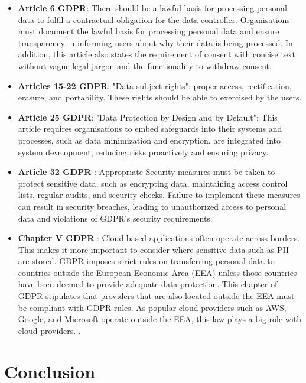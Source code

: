 \begin{itemize}
    \label{section:gdpr}
    \item \textbf{Article 6 GDPR}: There should be a lawful basis for processing personal data to fulfil a contractual obligation for the data controller. Organisations must document the lawful basis for processing personal data and ensure transparency in informing users about why their data is being processed. In addition, this article also states the requirement of consent with concise text without vague legal jargon and the functionality to withdraw consent.
    
    \item \textbf{Articles 15-22 GDPR}: "Data subject rights": proper access, rectification, erasure, and portability. These rights should be able to exercised by the users. 

    \item \textbf{Article 25 GDPR}: "Data Protection by Design and by Default": This article requires organisations to embed safeguards into their systems and processes, such as data minimization and encryption, are integrated into system development, reducing risks proactively and ensuring privacy. 

    \item \textbf{Article 32 GDPR }: Appropriate Security measures must be taken to protect sensitive data, such as encrypting data, maintaining access control lists, regular audits, and security checks. Failure to implement these measures can result in security breaches, leading to unauthorized access to personal data and violations of GDPR’s security requirements.
    
    
    \item \textbf{Chapter V GDPR }: Cloud based applications often operate across borders. This makes it more important to consider where sensitive data such as PII are stored. GDPR imposes strict rules on transferring personal data to countries outside the European Economic Area (EEA) unless those countries have been deemed to provide adequate data protection. This chapter of GDPR stipulates that providers that are also located outside the EEA must be compliant with GDPR rules. As popular cloud providers such as AWS, Google, and Microsoft operate outside the EEA, this law plays a big role with cloud providers.  
.
\end{itemize}

\section{Conclusion}

